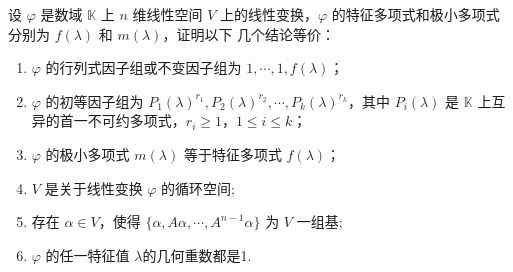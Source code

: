 \documentclass[../../main.tex]{subfiles}
\begin{document}
\begin{theorem}[循环子空间的刻画]\label{theorem:循环子空间的刻画}
设 \(\varphi\) 是数域 \(\mathbb{K}\) 上 \(n\) 维线性空间 \(V\) 上的线性变换，\(\varphi\) 的特征多项式和极小多项式分别为 \(f(\lambda)\) 和 \(m(\lambda)\)，证明以下 几个结论等价：
\begin{enumerate}[(1)]
\item \(\varphi\) 的行列式因子组或不变因子组为 \(1,\cdots,1,f(\lambda)\)；

\item \(\varphi\) 的初等因子组为 \(P_1(\lambda)^{r_1},P_2(\lambda)^{r_2},\cdots,P_k(\lambda)^{r_k}\)，其中 \(P_i(\lambda)\) 是 \(\mathbb{K}\) 上互异的首一不可约多项式，\(r_i\geqslant 1\)，\(1\leqslant  i\leqslant  k\)； 

\item \(\varphi\) 的极小多项式 \(m(\lambda)\) 等于特征多项式 \(f(\lambda)\)； 

\item \(V\) 是关于线性变换 \(\varphi\) 的循环空间;

\item 存在 \( \alpha \in V \)，使得 \( \{ \alpha, A\alpha, \cdots, A^{n - 1}\alpha \} \) 为 \( V \) 一组基;

\item \(\varphi\) 的任一特征值 \( \lambda \)的几何重数都是1.
\end{enumerate}
\end{theorem}
\end{document}
